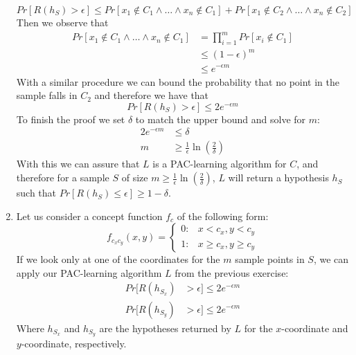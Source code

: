 \documentclass{article}
\begin{document}
\begin{enumerate}[1.]
        \begin{equation*}
            Pr[R(h_S) > \epsilon] \leq Pr[x_1 \notin C_1 \wedge \dots \wedge x_n \notin C_1] + Pr[x_1 \notin C_2 \wedge \dots \wedge x_n \notin C_2]
        \end{equation*}
        Then we observe that
        \begin{align*}
            Pr[x_1 \notin C_1 \wedge \dots \wedge x_n \notin C_1] &= \prod_{i=1}^{m}Pr[x_i \notin C_1] \\
            &\leq (1 - \epsilon)^m \\
            &\leq e^{-\epsilon m}
        \end{align*}
        With a similar procedure we can bound the probability that no point in the sample falls in $C_2$ and therefore we have that
        \begin{equation*}
            Pr[R(h_S) > \epsilon] \leq 2e^{-\epsilon m}
        \end{equation*}
        To finish the proof we set $\delta$ to match the upper bound and solve for $m$:
        \begin{align*}
            2e^{-\epsilon m} &\leq \delta \\
            m &\geq \frac{1}{\epsilon}\ln\left(\frac{2}{\delta}\right)
        \end{align*}
        With this we can assure that $L$ is a PAC-learning algorithm for $C$, and therefore for a sample $S$ of size $m \geq \frac{1}{\epsilon}\ln\left(\frac{2}{\delta}\right)$, $L$ will return a hypothesis $h_S$ such that $Pr[R(h_S) \leq \epsilon] \geq 1 - \delta$.
        \clearpage
        \item Let us consider  a concept function $f_c$ of the following form:
        \[
        f_{c_xc_y}(x, y)=
        \begin{cases} 
            0: & x < c_x,y < c_y \\
            1: & x \geq c_x,y \geq c_y
        \end{cases}
        \]
        If we look only at one of the coordinates for the $m$ sample points in $S$, we can apply our PAC-learning algorithm $L$ from the previous exercise:
        \begin{align*}
            Pr[R(h_{S_x}) &> \epsilon] \leq 2e^{-\epsilon m} \\
            Pr[R(h_{S_y}) &> \epsilon] \leq 2e^{-\epsilon m}
        \end{align*}
        Where $h_{S_x}$ and $h_{S_y}$ are the hypotheses returned by $L$ for the $x$-coordinate and $y$-coordinate, respectively.\\

\end{enumerate}
\end{document}
